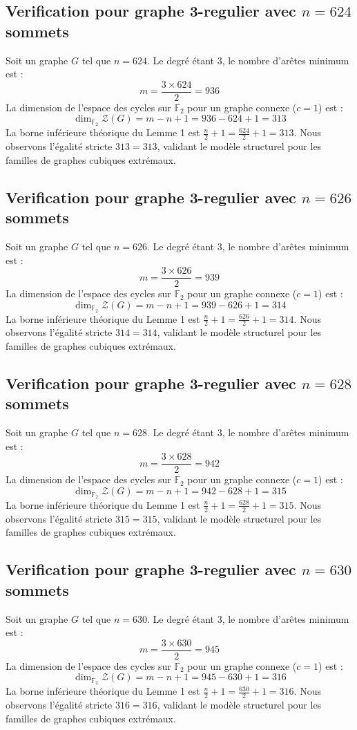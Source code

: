 \documentclass[11pt,a4paper]{article}
\begin{document}
\subsection{Verification pour graphe 3-regulier avec $n=624$ sommets}
Soit un graphe $G$ tel que $n = 624$. Le degré étant 3, le nombre d'arêtes minimum est :
$$ m = \frac{3 \times 624}{2} = 936 $$
La dimension de l'espace des cycles sur $\mathbb{F}_2$ pour un graphe connexe ($c=1$) est :
$$ \dim_{\mathbb{F}_2} \mathcal{Z}(G) = m - n + 1 = 936 - 624 + 1 = 313 $$
La borne inférieure théorique du Lemme 1 est $\frac{n}{2} + 1 = \frac{624}{2} + 1 = 313$.
Nous observons l'égalité stricte $313 = 313$, validant le modèle structurel pour les familles de graphes cubiques extrémaux.

\subsection{Verification pour graphe 3-regulier avec $n=626$ sommets}
Soit un graphe $G$ tel que $n = 626$. Le degré étant 3, le nombre d'arêtes minimum est :
$$ m = \frac{3 \times 626}{2} = 939 $$
La dimension de l'espace des cycles sur $\mathbb{F}_2$ pour un graphe connexe ($c=1$) est :
$$ \dim_{\mathbb{F}_2} \mathcal{Z}(G) = m - n + 1 = 939 - 626 + 1 = 314 $$
La borne inférieure théorique du Lemme 1 est $\frac{n}{2} + 1 = \frac{626}{2} + 1 = 314$.
Nous observons l'égalité stricte $314 = 314$, validant le modèle structurel pour les familles de graphes cubiques extrémaux.

\subsection{Verification pour graphe 3-regulier avec $n=628$ sommets}
Soit un graphe $G$ tel que $n = 628$. Le degré étant 3, le nombre d'arêtes minimum est :
$$ m = \frac{3 \times 628}{2} = 942 $$
La dimension de l'espace des cycles sur $\mathbb{F}_2$ pour un graphe connexe ($c=1$) est :
$$ \dim_{\mathbb{F}_2} \mathcal{Z}(G) = m - n + 1 = 942 - 628 + 1 = 315 $$
La borne inférieure théorique du Lemme 1 est $\frac{n}{2} + 1 = \frac{628}{2} + 1 = 315$.
Nous observons l'égalité stricte $315 = 315$, validant le modèle structurel pour les familles de graphes cubiques extrémaux.

\subsection{Verification pour graphe 3-regulier avec $n=630$ sommets}
Soit un graphe $G$ tel que $n = 630$. Le degré étant 3, le nombre d'arêtes minimum est :
$$ m = \frac{3 \times 630}{2} = 945 $$
La dimension de l'espace des cycles sur $\mathbb{F}_2$ pour un graphe connexe ($c=1$) est :
$$ \dim_{\mathbb{F}_2} \mathcal{Z}(G) = m - n + 1 = 945 - 630 + 1 = 316 $$
La borne inférieure théorique du Lemme 1 est $\frac{n}{2} + 1 = \frac{630}{2} + 1 = 316$.
Nous observons l'égalité stricte $316 = 316$, validant le modèle structurel pour les familles de graphes cubiques extrémaux.
\end{document}
